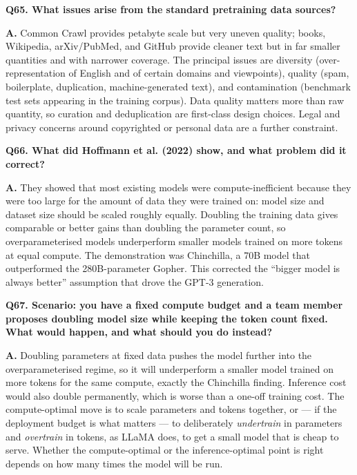 \documentclass[11pt]{article}
\begin{document}
\medskip
\noindent\textbf{Q65. What issues arise from the standard pretraining data sources?}

\noindent\textbf{A.} Common Crawl provides petabyte scale but very uneven quality; books, Wikipedia, arXiv/PubMed, and GitHub provide cleaner text but in far smaller quantities and with narrower coverage. The principal issues are diversity (over-representation of English and of certain domains and viewpoints), quality (spam, boilerplate, duplication, machine-generated text), and contamination (benchmark test sets appearing in the training corpus). Data quality matters more than raw quantity, so curation and deduplication are first-class design choices. Legal and privacy concerns around copyrighted or personal data are a further constraint.

\medskip
\noindent\textbf{Q66. What did Hoffmann et al. (2022) show, and what problem did it correct?}

\noindent\textbf{A.} They showed that most existing models were compute-inefficient because they were too large for the amount of data they were trained on: model size and dataset size should be scaled roughly equally. Doubling the training data gives comparable or better gains than doubling the parameter count, so overparameterised models underperform smaller models trained on more tokens at equal compute. The demonstration was Chinchilla, a 70B model that outperformed the 280B-parameter Gopher. This corrected the ``bigger model is always better'' assumption that drove the GPT-3 generation.

\medskip
\noindent\textbf{Q67. Scenario: you have a fixed compute budget and a team member proposes doubling model size while keeping the token count fixed. What would happen, and what should you do instead?}

\noindent\textbf{A.} Doubling parameters at fixed data pushes the model further into the overparameterised regime, so it will underperform a smaller model trained on more tokens for the same compute, exactly the Chinchilla finding. Inference cost would also double permanently, which is worse than a one-off training cost. The compute-optimal move is to scale parameters and tokens together, or --- if the deployment budget is what matters --- to deliberately \emph{undertrain} in parameters and \emph{overtrain} in tokens, as LLaMA does, to get a small model that is cheap to serve. Whether the compute-optimal or the inference-optimal point is right depends on how many times the model will be run.
\end{document}

